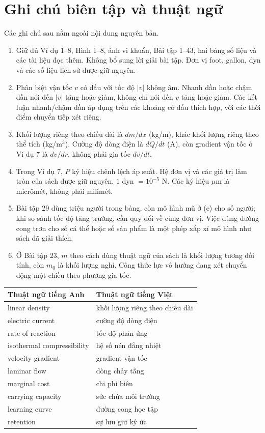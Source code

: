 \documentclass[12pt,a4paper]{article}
\begin{document}
\section*{Ghi chú biên tập và thuật ngữ}
Các ghi chú sau nằm ngoài nội dung nguyên bản.
\begin{enumerate}[leftmargin=*]
\item Giữ đủ Ví dụ 1–8, Hình 1–8, ảnh vi khuẩn, Bài tập 1–43, hai bảng số liệu và các tài liệu đọc thêm. Không bổ sung lời giải bài tập. Đơn vị foot, gallon, dyn và các số liệu lịch sử được giữ nguyên.
\item Phân biệt vận tốc $v$ có dấu với tốc độ $|v|$ không âm. Nhanh dần hoặc chậm dần nói đến $|v|$ tăng hoặc giảm, không chỉ nói đến $v$ tăng hoặc giảm. Các kết luận nhanh/chậm dần áp dụng trên các khoảng có dấu thích hợp, với các thời điểm chuyển tiếp xét riêng.
\item Khối lượng riêng theo chiều dài là $dm/dx$ (kg/m), khác khối lượng riêng theo thể tích (kg/m$^3$). Cường độ dòng điện là $dQ/dt$ (A), còn gradient vận tốc ở Ví dụ 7 là $dv/dr$, không phải gia tốc $dv/dt$.
\item Trong Ví dụ 7, $P$ ký hiệu chênh lệch áp suất. Hệ đơn vị và các giá trị làm tròn của sách được giữ nguyên. $1$ dyn $=10^{-5}$ N. Các ký hiệu $\mu$m là micrômét, không phải milimét.
\item Bài tập 29 dùng triệu người trong bảng, còn mô hình mũ ở (e) cho số người; khi so sánh tốc độ tăng trưởng, cần quy đổi về cùng đơn vị. Việc dùng đường cong trơn cho số cá thể hoặc số sản phẩm là một phép xấp xỉ mô hình như sách đã giải thích.
\item Ở Bài tập 23, $m$ theo cách dùng thuật ngữ của sách là khối lượng tương đối tính, còn $m_0$ là khối lượng nghỉ. Công thức lực vô hướng đang xét chuyển động một chiều theo phương gia tốc.
\end{enumerate}
\begin{longtable}{p{.43\linewidth}p{.49\linewidth}}\toprule
Thuật ngữ tiếng Anh & Thuật ngữ tiếng Việt\\\midrule
linear density & khối lượng riêng theo chiều dài\\
electric current & cường độ dòng điện\\
rate of reaction & tốc độ phản ứng\\
isothermal compressibility & hệ số nén đẳng nhiệt\\
velocity gradient & gradient vận tốc\\
laminar flow & dòng chảy tầng\\
marginal cost & chi phí biên\\
carrying capacity & sức chứa môi trường\\
learning curve & đường cong học tập\\
retention & sự lưu giữ ký ức\\
\bottomrule\end{longtable}
\end{document}
